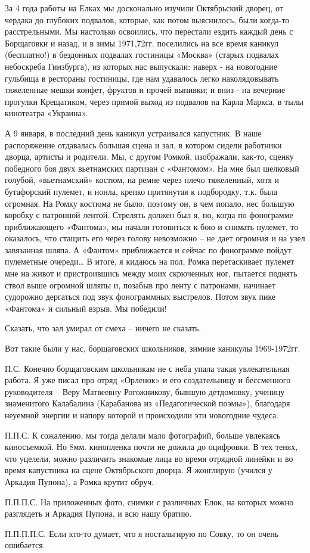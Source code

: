 За 4 года работы на Елках мы досконально изучили Октябрьский дворец, от чердака
до глубоких подвалов, которые, как потом выяснилось, были когда-то
расстрельными. Мы настолько освоились, что перестали ездить каждый день с
Борщаговки и назад, и в зимы 1971,72гг. поселились на все время каникул
(бесплатно!) в бездонных подвалах гостиницы «Москва» (старых подвалах
небоскреба Гинзбурга), из которых нас выпускали: наверх - на новогодние
гульбища в рестораны гостиницы, где нам удавалось легко наколядовывать
тяжеленные мешки конфет, фруктов и прочей выпивки; и вниз - на вечерние
прогулки Крещатиком, через прямой выход из подвалов на Карла Маркса, в тылы
кинотеатра «Украина». 

А 9 января, в последний день каникул устраивался капустник. В наше распоряжение
отдавалась большая сцена и зал, в котором сидели работники дворца, артисты и
родители. Мы, с другом Ромкой, изображали, как-то, сценку победного боя двух
вьетнамских партизан с «Фантомом». На мне был шелковый голубой,  «вьетнамский»
костюм, на ремне через плечо тяжеленный, хотя и бутафорский пулемет, и нонла,
крепко притянутая к подбородку, т.к. была огромная. На Ромку костюма не было,
поэтому он, в чем попало, нес большую коробку с патронной лентой. Стрелять
должен был я, но, когда по фонограмме приближающего «Фантома», мы начали
готовиться к бою и снимать пулемет, то оказалось, что стащить его через голову
невозможно – не дает огромная и на узел завязанная шляпа. А «Фантом»
приближается и сейчас по фонограмме пойдут пулеметные очереди…  В итоге, я
кидаюсь на пол, Ромка перетаскивает пулемет мне на живот и пристроившись между
моих скрюченных ног, пытается поднять ствол выше огромной шляпы и, позабыв про
ленту с патронами, начинает судорожно дергаться под звук фонограммных
выстрелов. Потом звук пике «Фантома» и сильный взрыв. Мы победили! 

Сказать, что зал умирал от смеха – ничего не сказать.

Вот такие были у нас, борщаговских школьников, зимние каникулы 1969-1972гг. 

П.С. Конечно борщаговским школьникам не с неба упала такая увлекательная
работа. Я уже писал про отряд «Орленок» и его создательницу и бессменного
руководителя – Веру Матвеевну Рогожникову, бывшую детдомовку, ученицу
знаменитого Калабалина (Карабанова из «Педагогической поэмы»), благодаря
неуемной энергии и напору которой и происходили эти новогодние чудеса.

П.П.С. К сожалению, мы тогда делали мало фотографий, больше увлекаясь
киносъемкой. Но 8мм. кинопленка почти не дожила до оцифровки. В тех тенях, что
уцелели, можно различить знакомые лица во время отрядной линейки и во время
капустника на сцене Октябрьского дворца. Я жонглирую (учился у Аркадия Пупона),
а Ромка крутит обруч.

П.П.П.С. На приложенных фото, снимки с различных Елок, на которых можно
разглядеть и Аркадия Пупона, и всю нашу братию.

П.П.П.П.С. Если кто-то думает, что я ностальгирую по Совку, то он очень
ошибается.
